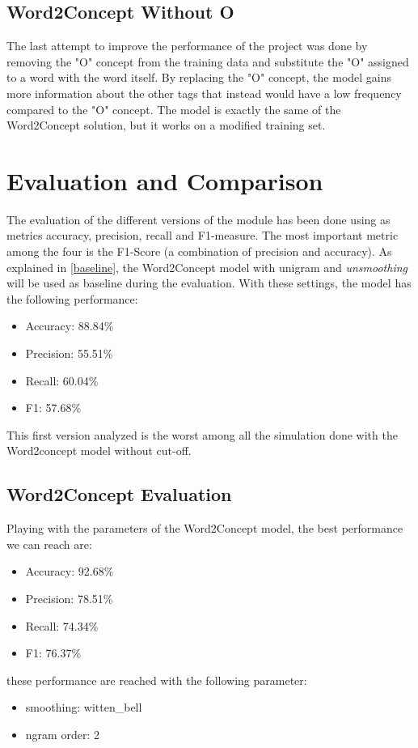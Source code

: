 \documentclass[11pt,a4paper]{article}
\begin{document}
\subsection{Word2Concept Without O}
The last attempt to improve the performance of the project was done by removing the "O" concept from the training data and substitute the "O" assigned to a word with the word itself. By replacing the "O" concept, the model gains more information about the other tags that instead would have a low frequency compared to the "O" concept. The model is exactly the same of the Word2Concept solution, but it works on a modified training set.
\section{Evaluation and Comparison}
The evaluation of the different versions of the module has been done using as metrics accuracy,
precision, recall and F1-measure. The most important metric among the four is the F1-Score (a combination of precision and accuracy). As explained in \ref{baseline}, the Word2Concept model with unigram and \textit{unsmoothing} will be used as baseline during the evaluation. With these settings, the model has the following performance:
\begin{itemize}
    \item Accuracy: 88.84\%
    \item Precision: 55.51\%
    \item Recall:   60.04\%
    \item F1:   57.68\%
\end{itemize}
This first version analyzed is the worst among all the simulation done with the Word2concept model without cut-off.
\subsection{Word2Concept Evaluation}
Playing with the parameters of the Word2Concept model, the best performance we can reach are:
\begin{itemize}
    \item Accuracy: 92.68\%
    \item Precision: 78.51\%
    \item Recall:   74.34\%
    \item F1:   76.37\%
\end{itemize}
these performance are reached with the following parameter:
\begin{itemize}
    \item smoothing: witten\_bell
    \item ngram order: 2
\end{itemize}
\end{document}
